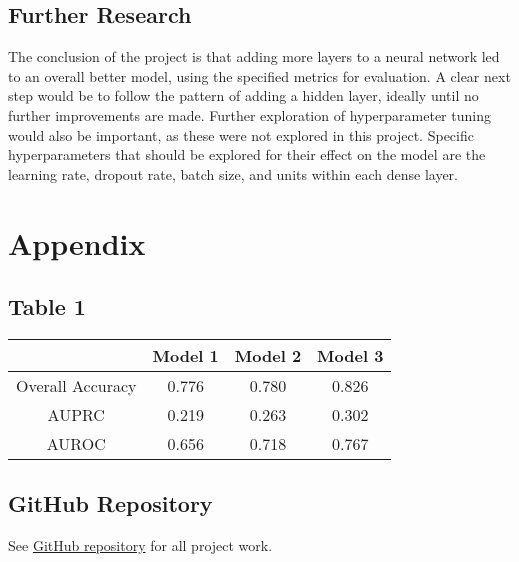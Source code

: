 \documentclass{article}
\begin{document}
\begin{multicols}{2}
\section{Further Research}
The conclusion of the project is that adding more layers to a neural network led to an overall better model, using the specified metrics for evaluation. A clear next step would be to follow the pattern of adding a hidden layer, ideally until no further improvements are made. Further exploration of hyperparameter tuning would also be important, as these were not explored in this project. Specific hyperparameters that should be explored for their effect on the model are the learning rate, dropout rate, batch size, and units within each dense layer.

\end{multicols}

\section{Appendix}
\subsection{Table 1}
\begin{center}

\begin{tabular}{||c c c c||}
 \hline
 \ & Model 1 & Model 2 & Model 3 \\ [0.5ex] 
 \hline\hline
 Overall Accuracy & 0.776 & 0.780 & 0.826 \\ 
 \hline
 AUPRC & 0.219 & 0.263 & 0.302 \\
 \hline
 AUROC & 0.656 & 0.718 & 0.767 \\
 \hline
\end{tabular}
\end{center}
\subsection{GitHub Repository}
See \href{https://github.com/jacksondial/823FinalProject}{GitHub repository} for all project work.
\end{document}
